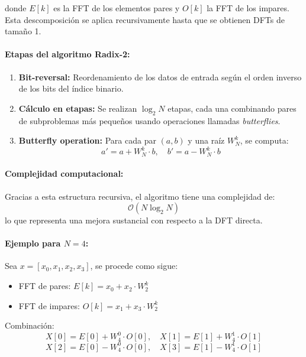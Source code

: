 donde $E[k]$ es la FFT de los elementos pares y $O[k]$ la FFT de los impares. Esta descomposición se aplica recursivamente hasta que se obtienen DFTs de tamaño 1.

\paragraph{Etapas del algoritmo Radix-2:}

\begin{enumerate}
    \item \textbf{Bit-reversal:} Reordenamiento de los datos de entrada según el orden inverso de los bits del índice binario.
    \item \textbf{Cálculo en etapas:} Se realizan $\log_2 N$ etapas, cada una combinando pares de subproblemas más pequeños usando operaciones llamadas \textit{butterflies}.
    \item \textbf{Butterfly operation:} Para cada par $(a, b)$ y una raíz $W_N^k$, se computa:
          \begin{equation}
              a' = a + W_N^k \cdot b, \quad b' = a - W_N^k \cdot b
          \end{equation}
\end{enumerate}

\paragraph{Complejidad computacional:}

Gracias a esta estructura recursiva, el algoritmo tiene una complejidad de:
\begin{equation}
    \mathcal{O}(N \log_2 N)
\end{equation}
lo que representa una mejora sustancial con respecto a la DFT directa.

\paragraph{Ejemplo para $N=4$:}

Sea $x = [x_0, x_1, x_2, x_3]$, se procede como sigue:

\begin{itemize}
    \item FFT de pares: $E[k] = x_0 + x_2 \cdot W_2^k$
    \item FFT de impares: $O[k] = x_1 + x_3 \cdot W_2^k$
\end{itemize}

\noindent Combinación:
\begin{equation}
    X[0] = E[0] + W_4^0 \cdot O[0], \quad X[1] = E[1] + W_4^1 \cdot O[1]
\end{equation}
\begin{equation}
    X[2] = E[0] - W_4^0 \cdot O[0], \quad X[3] = E[1] - W_4^1 \cdot O[1]
\end{equation}


